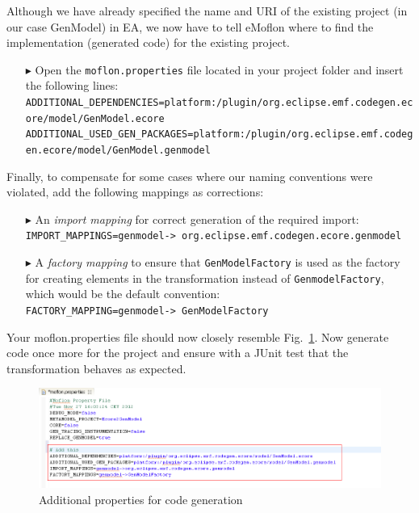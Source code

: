 Although we have already specified the name and URI of the existing project (in our case \textsf{GenModel}) in EA, we now have to tell eMoflon where to find the implementation (generated code) for the existing project. 
\begin{enumerate}
\item[$\blacktriangleright$] Open the \texttt{moflon.properties} file located in your project folder and insert the following lines:\\
\texttt{{\tiny ADDITIONAL\_DEPENDENCIES=platform:/plugin/org.eclipse.emf.codegen.ecore/model/GenModel.ecore}}\\
\texttt{{\tiny ADDITIONAL\_USED\_GEN\_PACKAGES=platform:/plugin/org.eclipse.emf.codegen.ecore/model/GenModel.genmodel}}
\end{enumerate}

Finally, to compensate for some cases where our naming conventions were violated, add the following mappings as corrections:

\begin{enumerate}
\item[$\blacktriangleright$] An \emph{import mapping} for correct generation of the required import:\\
\texttt{\tiny IMPORT\_MAPPINGS=genmodel-> org.eclipse.emf.codegen.ecore.genmodel}
\item [$\blacktriangleright$] A \emph{factory mapping} to ensure that \texttt{GenModelFactory} is used as the factory for creating elements in the transformation instead of \texttt{Genmodel\-Factory}, which would be the default convention:\\
\texttt{\tiny FACTORY\_MAPPING=genmodel-> GenModelFactory}
\end{enumerate}

Your \textsf{moflon.properties} file should now closely resemble Fig.~\ref{fig_mofProp}.
Now generate code once more for the project and ensure with a JUnit test that the transformation behaves as expected.

\begin{figure}[htbp]
\begin{center}  \includegraphics[width=1.3\textwidth]{pics/Ecore2GenModel_Bilder/9_mofProperties.png}
  \caption{Additional properties for code generation}  
  \label{fig_mofProp}
\end{center}
\end{figure} 

\clearpage




